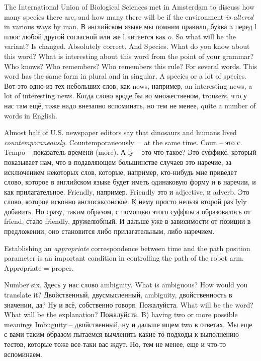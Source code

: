 \documentclass[main.tex]{subfiles}
\begin{document}
The International Union of Biological Sciences met in Amsterdam to discuss how many species there are, and how many there will be if the environment \textit{is altered} in various ways by man. 
В английском языке мы помним правило, буква a перед l плюс любой другой согласной или же l читается как o.
So what will be the variant?
Is changed.
Absolutely correct.
And Species.
What do you know about this word?
What is interesting about this word from the point of your grammar?
Who knows?
Who remembers?
Who remembers this rule?
For several words.
This word has the same form in plural and in singular.
A species or a lot of species.
Вот это одно из тех небольших слов, как news, например, an interesting news, a lot of interesting news.
Когда слово вроде бы во множественом, trousers, что у нас там ещё, тоже надо внезапно вспоминать, но тем не менее, quite a number of words in English.

Almost half of U.S. newspaper editors say that dinosaurs and humans lived \textit{countemporaneously}.
Countemporaneously = at the same time.
Coun -- это с.
Tempo -- показатель времени (more).
А ly -- это что такое?
Это суффикс, который показывает нам, что в подавляющем большинстве случаев это наречие, за исключением некоторых слов, которые, например, кто-нибудь мне приведет слово, которое в английском языке будет иметь одинаковую форму и в наречии, и как прилагательное.
Friendly, например.
Friendly это и adjective, и adverb.
Это слово, которое исконно англосаксонское.
К нему просто нельзя второй раз lyly добавить.
Но сразу, таким образом, с помощью этого суффикса образовалось от friend, стало friendly, дружелюбный.
И дальше уже в зависимости от позиции в предложении, оно становится либо прилагательным, либо наречием.

Establishing an \textit{appropriate} correspondence between time and the path position parameter is an important condition in controlling the path of the robot arm.
Appropriate = proper.

Number six.
Здесь у нас слово ambiguity.
What is ambiguous? How would you translate it?
Двойственный, двусмысленный, ambiguity, двойственность в значении, да?
Ну и всё, собственно говоря.
Пожалуйста.
What will be the word? What will be the explanation? Пожалуйста.
B) having two or more possible meanings
Imbuguity -- двойственный, ну и дальше ищем two в ответах.
Мы еще с вами таким образом пытаемся вычленить какие-то подходы к выполнению тестов, которые тоже все-таки вас ждут.
Но, тем не менее, еще и что-то вспоминаем.
\end{document}
